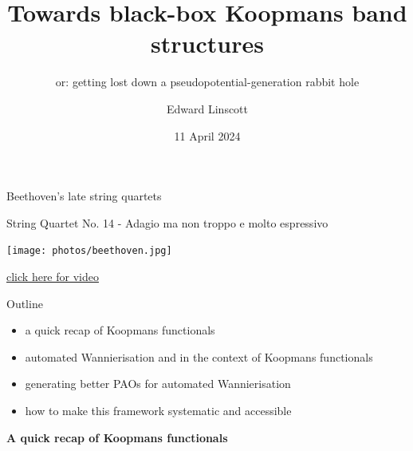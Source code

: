 \documentclass[xcolor=table,aspectratio=169]{beamer}
\author{Edward Linscott}
\institute{PSI}
\date{11 April 2024}
\title{Towards black-box Koopmans band structures}
\subtitle{or: getting lost down a pseudopotential-generation rabbit hole}
\numberwithin{equation}{section}
\begin{document}
\begin{frame}{Beethoven's late string quartets}
   \centering

   String Quartet No. 14 - Adagio ma non troppo e molto espressivo

   \vspace{6pt}

   \texttt{[image: photos/beethoven.jpg]}

   {\tiny \href{https://www.youtube.com/watch?v=JE_crvhG3Co\&t=454s\&ab_channel=DavidSukonick\#t=4m27s}{click here for video}}



\end{frame}

\frame{\titlepage}

\begin{frame}{Outline}
   \begin{itemize}
      \item a quick recap of Koopmans functionals
      \item automated Wannierisation and in the context of Koopmans functionals
      \item generating better PAOs for automated Wannierisation
      \item how to make this framework systematic and accessible
   \end{itemize}
\end{frame}

\begin{frame}{}
   \begin{center}
      \Huge \bf A quick recap of Koopmans functionals
   \end{center}
\end{frame}
\end{document}
